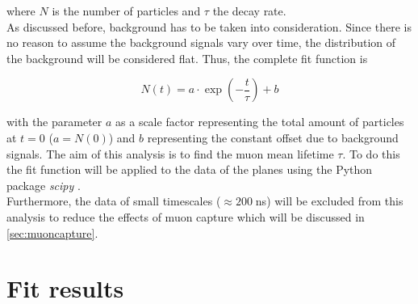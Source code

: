 where $N$ is the number of particles and $\tau$ the decay rate.\\ As discussed before,
 background has to be taken into consideration. Since there is no reason to assume
the background signals vary over time, the distribution of the background will be considered flat. Thus, the complete fit function is 

\begin{equation}
    N(t) = a \cdot \exp\left(- \frac{t}{\tau}\right) + b 
    \label{eqn:fit}
\end{equation}

with the parameter $a$ as a scale factor representing the total amount of particles at $t=0$ ($ a = N(0)$)
and $b$ representing the constant offset due to background signals. The aim of this analysis is to 
find the muon mean lifetime $\tau$. To do this the fit function will be applied to the data of the planes 
using the Python package \textit{scipy} \cite{scipy}.\\
Furthermore, the data of small timescales ($\approx 200\;$ns) will be excluded from this analysis
to reduce the effects of muon capture 
which will be discussed in \autoref{sec:muoncapture}.

\section{Fit results}

